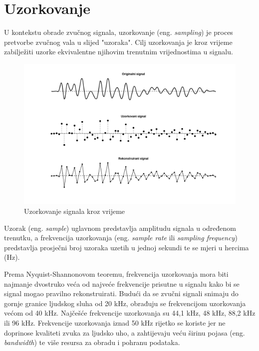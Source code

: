 \documentclass[times, utf8, diplomski, numeric]{fer}
\begin{document}
\section{Uzorkovanje}
U kontekstu obrade zvučnog signala, uzorkovanje (eng. \textit{sampling}) je proces pretvorbe zvučnog vala u slijed "uzoraka". Cilj uzorkovanja je kroz vrijeme zabilježiti uzorke ekvivalentne njihovim trenutnim vrijednostima u signalu.

\begin{figure}[H]
	\centerline{\includegraphics[width=1.2\textwidth]{sampling_signals.png}}
	\caption{Uzorkovanje signala kroz vrijeme}
	\label{fig}
\end{figure}

Uzorak (eng. \textit{sample}) uglavnom predstavlja amplitudu signala u određenom trenutku, a frekvencija uzorkovanja (eng. \textit{sample rate} ili \textit{sampling frequency}) predstavlja prosječni broj uzoraka uzetih u jednoj sekundi te se mjeri u hercima (Hz). 

Prema Nyquist-Shannonovom teoremu, frekvencija uzorkovanja mora biti najmanje dvostruko veća od najveće frekvencije prisutne u signalu kako bi se signal mogao pravilno rekonstruirati.\cite{candes2008introduction} Budući da se zvučni signali snimaju do gornje granice ljudskog sluha od 20 kHz, obrađuju se frekvencijom uzorkovanja većom od 40 kHz. Najčešće frekvencije uzorkovanja su 44,1 kHz, 48 kHz, 88,2 kHz ili 96 kHz.\cite{self2012audio} Frekvencije uzorkovanja iznad 50 kHz rijetko se koriste jer ne doprinose kvaliteti zvuka za ljudsko uho, a zahtijevaju veću širinu pojasa (eng. \textit{bandwidth}) te više resursa za obradu i pohranu podataka.
\end{document}
